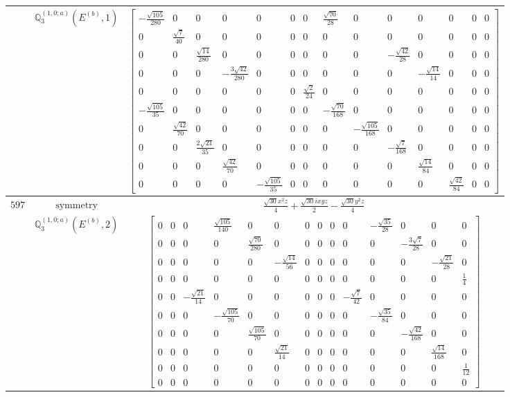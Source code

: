 \documentclass[fleqn,8pt,landscape]{jsarticle}
\begin{document}
\begin{longtable}{ccc}
$  $ & $ \mathbb{Q}_{3}^{(1,0;a)}(E^{(b)},1) $ & $ \begin{bmatrix} - \frac{\sqrt{105}}{280} & 0 & 0 & 0 & 0 & 0 & 0 & \frac{\sqrt{70}}{28} & 0 & 0 & 0 & 0 & 0 & 0 \\ 0 & \frac{\sqrt{7}}{40} & 0 & 0 & 0 & 0 & 0 & 0 & 0 & 0 & 0 & 0 & 0 & 0 \\ 0 & 0 & \frac{\sqrt{14}}{280} & 0 & 0 & 0 & 0 & 0 & 0 & - \frac{\sqrt{42}}{28} & 0 & 0 & 0 & 0 \\ 0 & 0 & 0 & - \frac{3 \sqrt{42}}{280} & 0 & 0 & 0 & 0 & 0 & 0 & - \frac{\sqrt{14}}{14} & 0 & 0 & 0 \\ 0 & 0 & 0 & 0 & 0 & 0 & \frac{\sqrt{2}}{24} & 0 & 0 & 0 & 0 & 0 & 0 & 0 \\ - \frac{\sqrt{105}}{35} & 0 & 0 & 0 & 0 & 0 & 0 & - \frac{\sqrt{70}}{168} & 0 & 0 & 0 & 0 & 0 & 0 \\ 0 & \frac{\sqrt{42}}{70} & 0 & 0 & 0 & 0 & 0 & 0 & - \frac{\sqrt{105}}{168} & 0 & 0 & 0 & 0 & 0 \\ 0 & 0 & \frac{2 \sqrt{21}}{35} & 0 & 0 & 0 & 0 & 0 & 0 & - \frac{\sqrt{7}}{168} & 0 & 0 & 0 & 0 \\ 0 & 0 & 0 & \frac{\sqrt{42}}{70} & 0 & 0 & 0 & 0 & 0 & 0 & \frac{\sqrt{14}}{84} & 0 & 0 & 0 \\ 0 & 0 & 0 & 0 & - \frac{\sqrt{105}}{35} & 0 & 0 & 0 & 0 & 0 & 0 & \frac{\sqrt{42}}{84} & 0 & 0 \end{bmatrix} $ \\ \hline
$ 597 $ & $ \text{symmetry} $ & $ \frac{\sqrt{30} x^{2} z}{4} + \frac{\sqrt{30} i x y z}{2} - \frac{\sqrt{30} y^{2} z}{4} $ \\
$  $ & $ \mathbb{Q}_{3}^{(1,0;a)}(E^{(b)},2) $ & $ \begin{bmatrix} 0 & 0 & 0 & \frac{\sqrt{105}}{140} & 0 & 0 & 0 & 0 & 0 & 0 & - \frac{\sqrt{35}}{28} & 0 & 0 & 0 \\ 0 & 0 & 0 & 0 & \frac{\sqrt{70}}{280} & 0 & 0 & 0 & 0 & 0 & 0 & - \frac{3 \sqrt{7}}{28} & 0 & 0 \\ 0 & 0 & 0 & 0 & 0 & - \frac{\sqrt{14}}{56} & 0 & 0 & 0 & 0 & 0 & 0 & - \frac{\sqrt{21}}{28} & 0 \\ 0 & 0 & 0 & 0 & 0 & 0 & 0 & 0 & 0 & 0 & 0 & 0 & 0 & \frac{1}{4} \\ 0 & 0 & - \frac{\sqrt{21}}{14} & 0 & 0 & 0 & 0 & 0 & 0 & - \frac{\sqrt{7}}{42} & 0 & 0 & 0 & 0 \\ 0 & 0 & 0 & - \frac{\sqrt{105}}{70} & 0 & 0 & 0 & 0 & 0 & 0 & - \frac{\sqrt{35}}{84} & 0 & 0 & 0 \\ 0 & 0 & 0 & 0 & \frac{\sqrt{105}}{70} & 0 & 0 & 0 & 0 & 0 & 0 & - \frac{\sqrt{42}}{168} & 0 & 0 \\ 0 & 0 & 0 & 0 & 0 & \frac{\sqrt{21}}{14} & 0 & 0 & 0 & 0 & 0 & 0 & \frac{\sqrt{14}}{168} & 0 \\ 0 & 0 & 0 & 0 & 0 & 0 & 0 & 0 & 0 & 0 & 0 & 0 & 0 & \frac{1}{12} \\ 0 & 0 & 0 & 0 & 0 & 0 & 0 & 0 & 0 & 0 & 0 & 0 & 0 & 0 \end{bmatrix} $ \\ \hline

\end{longtable}
\end{document}
